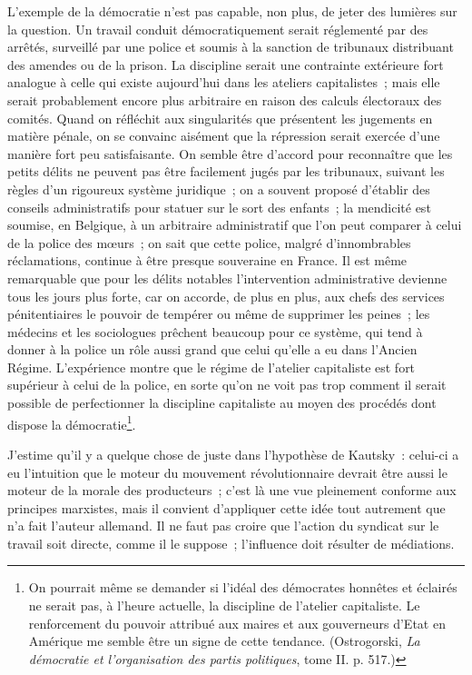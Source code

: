 \documentclass[french,twoside]{book} %
\begin{document}
L’exemple de la démocratie n’est pas capable, non plus, de jeter des lumières sur la question. Un travail conduit démocratiquement serait réglementé par des arrêtés, surveillé par une police et soumis à la sanction de tribunaux distribuant des amendes ou de la prison. La discipline serait une contrainte extérieure fort analogue à celle qui existe aujourd’hui dans les ateliers capitalistes ; mais elle serait probablement encore plus arbitraire en raison des calculs électoraux des comités. Quand on réfléchit aux singularités que présentent les jugements en matière pénale, on se convainc aisément que la répression serait exercée d’une manière fort peu satisfaisante. On semble être d’accord pour reconnaître que les petits délits ne peuvent pas être facilement jugés par les tribunaux, suivant les règles d’un rigoureux système juridique ; on a souvent proposé d’établir des conseils administratifs pour statuer sur le sort des enfants ; la mendicité est soumise, en Belgique, à un arbitraire administratif que l’on peut comparer à celui de la police des mœurs ; on sait que cette police, malgré d’innombrables réclamations, continue à être presque  souveraine en France. Il est même remarquable que pour les délits notables l’intervention administrative devienne tous les jours plus forte, car on accorde, de plus en plus, aux chefs des services pénitentiaires le pouvoir de tempérer ou même de supprimer les peines ; les médecins et les sociologues prêchent beaucoup pour ce système, qui tend à donner à la police un rôle aussi grand que celui qu’elle a eu dans l’Ancien Régime. L’expérience montre que le régime de l’atelier capitaliste est fort supérieur à celui de la police, en sorte qu’on ne voit pas trop comment il serait possible de perfectionner la discipline capitaliste au moyen des procédés dont dispose la démocratie\footnote{ \noindent On pourrait même se demander si l’idéal des démocrates honnêtes et éclairés ne serait pas, à l’heure actuelle, la discipline de l’atelier capitaliste. Le renforcement du pouvoir attribué aux maires et aux gouverneurs d’Etat en Amérique me semble être un signe de cette tendance. (Ostrogorski, \emph{La démocratie et l’organisation des partis politiques}, tome II. p. 517.)
 }.\par
J’estime qu’il y a quelque chose de juste dans l’hypothèse de Kautsky : celui-ci a eu l’intuition que le moteur du mouvement révolutionnaire devrait être aussi le moteur de la morale des producteurs ; c’est là une vue pleinement conforme aux principes marxistes, mais il convient d’appliquer cette idée tout autrement que n’a fait l’auteur allemand. Il ne faut pas croire que l’action du syndicat sur le travail soit directe, comme il le suppose ; l’influence doit résulter de médiations.\par
\end{document}
